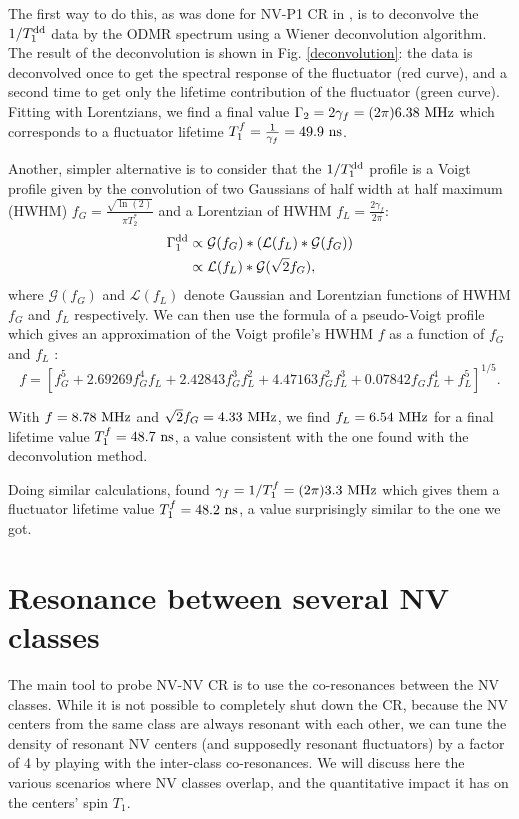 \documentclass[a4paper,11pt]{report}
\begin{document}
\begin{refsection}
The first way to do this, as was done for NV-P1 CR in \citep{hall2016detection}, is to deconvolve the $1/T_1^{\rm dd}$ data by the ODMR spectrum using a Wiener deconvolution algorithm. The result of the deconvolution is shown in Fig. \ref{deconvolution}: the data is deconvolved once to get the spectral response of the fluctuator (red curve), and a second time to get only the lifetime contribution of the fluctuator (green curve). Fitting with Lorentzians, we find a final value $\Gamma_2 =2\gamma_f= (2\pi) 6.38\ \rm MHz$ which corresponds to a fluctuator lifetime $T_1^f=\frac{1}{\gamma_f}=49.9\ \rm ns$.

Another, simpler alternative is to consider that the $1/T_1^{\rm dd}$ profile is a Voigt profile given by the convolution of two Gaussians of half width at half maximum (HWHM) $f_G=\frac{\sqrt{\ln (2)}}{\pi T_2^*}$ and a Lorentzian of HWHM $f_L=\frac{2 \gamma_f}{2 \pi}$:
\begin{align*}
\Gamma_1^{\rm dd}&\propto \mathcal{G}(f_G)*(\mathcal{L}(f_L)*\mathcal{G}(f_G)) \\
&\propto \mathcal{L}(f_L)*\mathcal{G}(\sqrt{2} f_G),
\end{align*}
where $\mathcal{G}(f_G)$ and $\mathcal{L}(f_L)$ denote Gaussian and Lorentzian functions of HWHM $f_G$ and $f_L$ respectively.
We can then use the formula of a pseudo-Voigt profile which gives an approximation of the Voigt profile's HWHM $f$ as a function of $f_G$ and $f_L$ \citep{ida2000extended}:
\begin{equation}
f = [f_G^5 + 2.69269 f_G^4 f_L + 2.42843 f_G^3 f_L^2 + 4.47163 f_G^2 f_L^3 + 0.07842 f_G f_L^4 + f_L^5]^{1/5}.
\end{equation}

With $f=8.78\ \rm MHz$ and $\sqrt{2}f_G=4.33\ \rm MHz$, we find $f_L=6.54\ \rm MHz$ for a final lifetime value $T_1^f = 48.7\ \rm ns$, a value consistent with the one found with the deconvolution method.

Doing similar calculations, \citep{choi2017depolarization} found $\gamma_f=1/T_1^f=(2\pi) 3.3\ \rm MHz$ which gives them a fluctuator lifetime value $T_1^f = 48.2\ \rm ns$, a value surprisingly similar to the one we got.


\section{Resonance between several NV classes}

The main tool to probe NV-NV CR is to use the co-resonances between the NV classes. While it is not possible to completely shut down the CR, because the NV centers from the same class are always resonant with each other, we can tune the density of resonant NV centers (and supposedly resonant fluctuators) by a factor of 4 by playing with the inter-class co-resonances. We will discuss here the various scenarios where NV classes overlap, and the quantitative impact it has on the centers' spin $T_1$.


\end{refsection}
\end{document}
